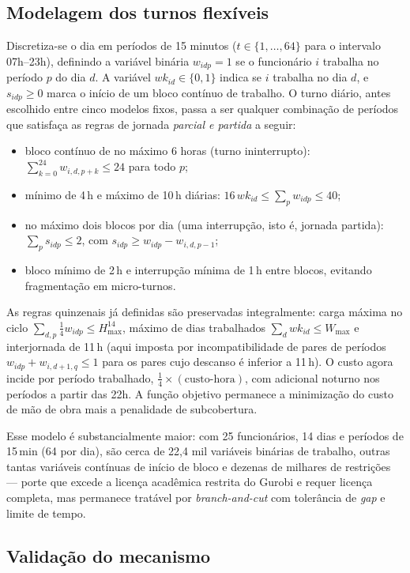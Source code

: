 \documentclass[12pt,a4paper]{article}
\begin{document}
\subsection{Modelagem dos turnos flexíveis}

Discretiza-se o dia em períodos de 15 minutos ($t \in \{1,\dots,64\}$ para o
intervalo 07h--23h), definindo a variável binária $w_{idp} = 1$ se o
funcionário $i$ trabalha no período $p$ do dia $d$. A variável $wk_{id} \in
\{0,1\}$ indica se $i$ trabalha no dia $d$, e $s_{idp} \ge 0$ marca o início
de um bloco contínuo de trabalho. O turno diário, antes escolhido entre cinco
modelos fixos, passa a ser qualquer combinação de períodos que satisfaça as
regras de jornada \emph{parcial e partida} a seguir:
\begin{itemize}
\item bloco contínuo de no máximo 6 horas (turno ininterrupto):
$\sum_{k=0}^{24} w_{i,d,p+k} \le 24$ para todo $p$;
\item mínimo de 4\,h e máximo de 10\,h diárias: $16\,wk_{id} \le \sum_p w_{idp}
\le 40$;
\item no máximo dois blocos por dia (uma interrupção, isto é, jornada
partida): $\sum_p s_{idp} \le 2$, com $s_{idp} \ge w_{idp} - w_{i,d,p-1}$;
\item bloco mínimo de 2\,h e interrupção mínima de 1\,h entre blocos, evitando
fragmentação em micro-turnos.
\end{itemize}
As regras quinzenais já definidas são preservadas integralmente: carga máxima
no ciclo $\sum_{d,p} \tfrac14 w_{idp} \le H_{\max}^{14}$, máximo de dias
trabalhados $\sum_d wk_{id} \le W_{\max}$ e interjornada de 11\,h (aqui imposta
por incompatibilidade de pares de períodos $w_{idp} + w_{i,d+1,q} \le 1$ para
os pares cujo descanso é inferior a 11\,h). O custo agora incide por período
trabalhado, $\tfrac14 \times (\text{custo-hora})$, com adicional noturno nos
períodos a partir das 22h. A função objetivo permanece a minimização do custo
de mão de obra mais a penalidade de subcobertura.

Esse modelo é substancialmente maior: com 25 funcionários, 14 dias e períodos
de 15\,min (64 por dia), são cerca de 22{,}4 mil variáveis binárias de
trabalho, outras tantas variáveis contínuas de início de bloco e dezenas de
milhares de restrições --- porte que excede a licença acadêmica restrita do
Gurobi e requer licença completa, mas permanece tratável por
\emph{branch-and-cut} com tolerância de \emph{gap} e limite de tempo.

\subsection{Validação do mecanismo}
\end{document}
